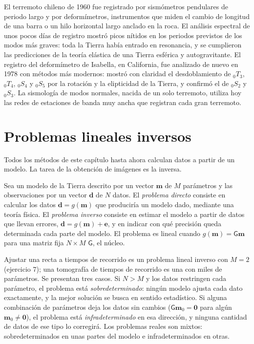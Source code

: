 \begin{history}
El terremoto chileno de 1960 fue registrado por sismómetros pendulares de periodo largo
y por deformímetros, instrumentos que miden el cambio de longitud de una
barra o un hilo horizontal largo anclado en la roca. El análisis espectral de unos pocos días de
registro mostró picos nítidos en los periodos previstos de los modos más graves: toda
la Tierra había entrado en resonancia, y se cumplieron las predicciones de la teoría
elástica de una Tierra esférica y autogravitante. El registro del deformímetro
de Isabella, en California, fue analizado de nuevo en 1978 con métodos más modernos:
mostró con claridad el desdoblamiento de ${}_0T_3$, ${}_0T_4$, ${}_0S_4$
y ${}_0S_5$ por la rotación y la elipticidad de la Tierra, y confirmó el de
${}_0S_2$ y ${}_0S_3$.
La sismología de modos normales, nacida de un solo terremoto, utiliza hoy las redes de
estaciones de banda muy ancha que registran cada gran terremoto.
\end{history}

\section{Problemas lineales inversos}\label{sec:b3:seismology-imaging:inverse}

Todos los métodos de este capítulo hasta ahora calculan datos a partir de un modelo. La
tarea de la obtención de imágenes es la inversa.

\begin{definition}\label{def:b3:seismology-imaging:inverse}
Sea un modelo de la Tierra descrito por un vector $\mathbf m$ de $M$ parámetros
y las observaciones por un vector $\mathbf d$ de $N$ datos. El \emph{problema
directo} consiste en calcular los datos $\mathbf d = g(\mathbf m)$
que produciría un modelo dado, mediante una teoría física. El \emph{problema
inverso} consiste en estimar el modelo a partir de datos que
llevan errores, $\mathbf d = g(\mathbf m) + \mathbf e$, y en indicar con qué precisión
queda determinada cada parte del modelo. El problema es lineal cuando $g(\mathbf m) =
\mathsf G\mathbf m$ para una matriz fija $N\times M$ $\mathsf G$, el núcleo.
\end{definition}

Ajustar una recta a tiempos de recorrido es un problema lineal inverso con
$M = 2$ (ejercicio 7); una tomografía de tiempos de recorrido es una con miles de
parámetros. Se presentan tres casos. Si $N > M$ y los datos restringen cada
parámetro, el problema está \emph{sobredeterminado}: ningún modelo ajusta cada dato
exactamente, y la mejor solución se busca en sentido estadístico. Si alguna combinación de
parámetros deja los datos sin cambios ($\mathsf G\mathbf m_0 = \mathbf 0$ para
algún $\mathbf m_0 \ne \mathbf 0$), el problema está \emph{infradeterminado} en esa
dirección, y ninguna cantidad de datos de ese tipo lo corregirá. Los problemas reales son
mixtos: sobredeterminados en unas partes del modelo e infradeterminados en
otras.

